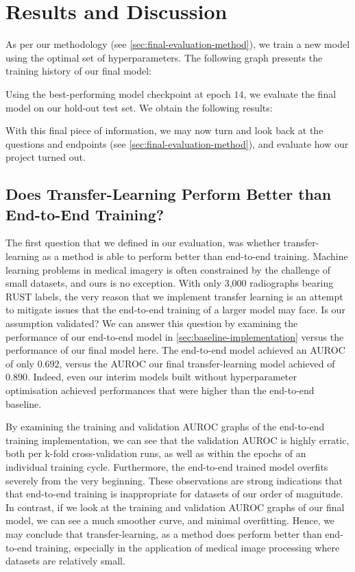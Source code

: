 \chapter{Results and Discussion}

As per our methodology (see \autoref{sec:final-evaluation-method}), we train a new model using the optimal set of hyperparameters. The following graph presents the training history of our final model:



\noindent
Using the best-performing model checkpoint at epoch \(14\), we evaluate the final model on our hold-out test set. We obtain the following results:



\noindent
With this final piece of information, we may now turn and look back at the questions and endpoints (see \autoref{sec:final-evaluation-method}), and evaluate how our project turned out.

\section{Does Transfer-Learning Perform Better than End-to-End Training?}

The first question that we defined in our evaluation, was whether transfer-learning as a method is able to perform better than end-to-end training. Machine learning problems in medical imagery is often constrained by the challenge of small datasets, and ours is no exception. With only 3,000 radiographs bearing RUST labels, the very reason that we implement transfer learning is an attempt to mitigate issues that the end-to-end training of a larger model may face. Is our assumption validated? We can answer this question by examining the performance of our end-to-end model in \autoref{sec:baseline-implementation} versus the performance of our final model here. The end-to-end model achieved an AUROC of only \(0.692\), versus the AUROC our final transfer-learning model achieved of \(0.890\). Indeed, even our interim models built without hyperparameter optimisation achieved performances that were higher than the end-to-end baseline.

By examining the training and validation AUROC graphs of the end-to-end training implementation, we can see that the validation AUROC is highly erratic, both per k-fold cross-validation runs, as well as within the epochs of an individual training cycle. Furthermore, the end-to-end trained model overfits severely from the very beginning. These observations are strong indications that that end-to-end training is inappropriate for datasets of our order of magnitude. In contrast, if we look at the training and validation AUROC graphs of our final model, we can see a much smoother curve, and minimal overfitting. Hence, we may conclude that transfer-learning, as a method does perform better than end-to-end training, especially in the application of medical image processing where datasets are relatively small.

